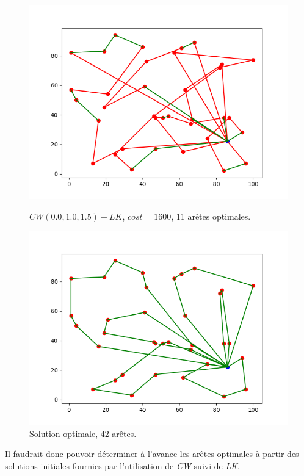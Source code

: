 \documentclass[a4paper,11pt]{article}%
\begin{document}
\begin{figure}
    \begin{minipage}[c]{.46\linewidth}
        \centering
	\includegraphics[scale=0.4]{edges010101.png}
	\caption{$CW(0.0,1.0,1.5)+LK$, $cost = 1600$, 11 arêtes optimales.}
	\label{edges010101}	
    \end{minipage}
    \hfill%
    \begin{minipage}[c]{.46\linewidth}
        \centering
	\includegraphics[scale=0.4]{edgesSol.png}
	\caption{Solution optimale, 42 arêtes.}
	\label{edgesSol}
    \end{minipage}
\end{figure}

Il faudrait donc pouvoir déterminer à l'avance les arêtes optimales à partir des solutions initiales fournies par l'utilisation de \emph{CW} suivi de \emph{LK}.
\end{document}

